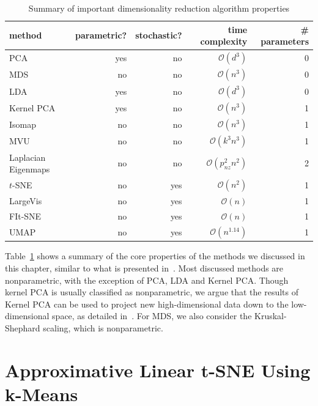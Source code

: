 \begin{table}
  \centering
  \begin{tabular}{lrrrr}
    \toprule
    method     & parametric? & stochastic? & time complexity       & \# parameters \\ \midrule
    PCA        & yes         & no          & $\mathcal{O}(d^3)$    & 0            \\
    MDS        & no          & no          & $\mathcal{O}(n^3)$    & 0            \\
    LDA        & yes         & no          & $\mathcal{O}(d^3)$    & 0            \\
    Kernel PCA & yes         & no          & $\mathcal{O}(n^3)$    & 1            \\
    Isomap     & no          & no          & $\mathcal{O}(n^3)$    & 1            \\
    MVU        & no          & no          & $\mathcal{O}(k^3n^3)$ & 1            \\
    Laplacian Eigenmaps & no & no & $\mathcal{O}(p_{nz}^2n^2)$ & 2 \\
    $t$-SNE & no & yes & $\mathcal{O}(n^2)$ & 1 \\
    LargeVis & no & yes & $\mathcal{O}(n)$ & 1 \\
    FIt-SNE & no & yes & $\mathcal{O}(n)$ & 1 \\
    UMAP & no & yes & $\mathcal{O}(n^{1.14})$ & 1 \\
    \bottomrule
  \end{tabular}
  \caption{Summary of important dimensionality reduction algorithm properties}
  \label{tab:summ-rw}
\end{table}

Table~\ref{tab:summ-rw} shows a summary of the core properties of the methods
we discussed in this chapter, similar to what is presented
in~\cite{vandermaaten_review}. Most discussed methods are nonparametric, with
the exception of PCA, LDA and Kernel PCA. Though kernel PCA is usually
classified as nonparametric, we argue that the results of Kernel PCA can be
used to project new high-dimensional data down to the low-dimensional space, as
detailed in~\cite{pca_parametric}. For MDS, we also consider the Kruskal-Shephard
scaling, which is nonparametric.

\chapter{Approximative Linear t-SNE Using k-Means}\label{ch:main}

